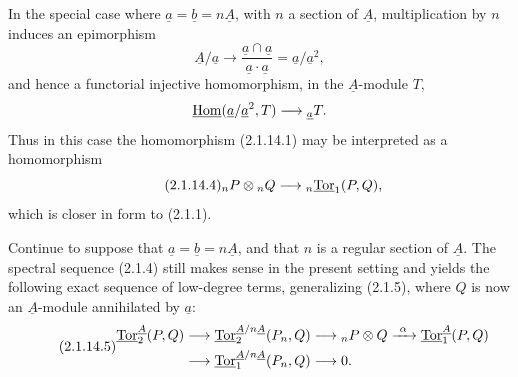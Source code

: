In the special case where
$\underline a=\underline b=n\underline A$, with $n$ a section of
$\underline A$, multiplication by $n$ induces an epimorphism
\[
 \underline A/\underline a
 \longrightarrow
 \frac{\underline a\cap\underline a}
      {\underline a\mathbin{\cdot}\underline a}
 =\underline a/\underline a^2,
\]
and hence a functorial injective homomorphism, in the
$\underline A$-module $T$,
\[
 \uHom(\underline a/\underline a^2,T)
 \longrightarrow{}_{\underline a}T.
\]
Thus in this case the homomorphism (2.1.14.1) may be interpreted as a
homomorphism
\begin{equation}\tag{2.1.14.4}
 {}_nP\otimes{}_nQ
 \longrightarrow{}_n\uTor_1(P,Q),
\end{equation}
which is closer in form to (2.1.1).

Continue to suppose that
$\underline a=\underline b=n\underline A$, and that $n$ is a regular
section of $\underline A$.  The spectral sequence (2.1.4) still makes
sense in the present setting and yields the following exact sequence
of low-degree terms, generalizing (2.1.5), where $Q$ is now an
$\underline A$-module annihilated by $\underline a$:
\begin{equation}\tag{2.1.14.5}
\begin{split}
 \uTor^{\underline A}_2(P,Q)
 &\longrightarrow
 \uTor^{\underline A/n\underline A}_2(P_n,Q)
 \longrightarrow{}_nP\otimes Q
 \xrightarrow{\ \alpha\ }
 \uTor^{\underline A}_1(P,Q)\\
 &\longrightarrow
 \uTor^{\underline A/n\underline A}_1(P_n,Q)
 \longrightarrow0.
\end{split}
\end{equation}

